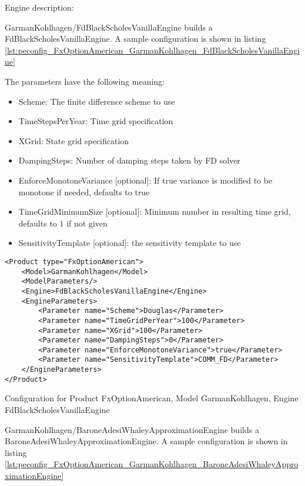Engine description:

GarmanKohlhagen/FdBlackScholesVanillaEngine builds a FdBlackScholesVanillaEngine. A sample configuration is shown in listing
\ref{lst:peconfig_FxOptionAmerican_GarmanKohlhagen_FdBlackScholesVanillaEngine}

The parameters have the following meaning:

\begin{itemize}
\item Scheme: The finite difference scheme to use
\item TimeStepsPerYear: Time grid specification
\item XGrid: State grid specification
\item DampingSteps: Number of damping steps taken by FD solver
\item EnforceMonotoneVariance [optional]: If true variance is modified to be monotone if needed, defaults to true
\item TimeGridMinimumSize [optional]: Minimum number in resulting time grid, defaults to $1$ if not given
\item SensitivityTemplate [optional]: the sensitivity template to use 
\end{itemize}

\begin{longlisting}
\begin{verbatim}
<Product type="FxOptionAmerican">
    <Model>GarmanKohlhagen</Model>
    <ModelParameters/>
    <Engine>FdBlackScholesVanillaEngine</Engine>
    <EngineParameters>
        <Parameter name="Scheme">Douglas</Parameter>
        <Parameter name="TimeGridPerYear">100</Parameter>
        <Parameter name="XGrid">100</Parameter>
        <Parameter name="DampingSteps">0</Parameter>
        <Parameter name="EnforceMonotoneVariance">true</Parameter>
        <Parameter name="SensitivityTemplate">COMM_FD</Parameter>
    </EngineParameters>
</Product>
\end{verbatim}
\caption{Configuration for Product FxOptionAmerican, Model GarmanKohlhagen, Engine FdBlackScholesVanillaEngine}
\label{lst:peconfig_FxOptionAmerican_GarmanKohlhagen_FdBlackScholesVanillaEngine}
\end{longlisting}

GarmanKohlhagen/BaroneAdesiWhaleyApproximationEngine builds a BaroneAdesiWhaleyApproximationEngine. A sample configuration is shown in listing
\ref{lst:peconfig_FxOptionAmerican_GarmanKohlhagen_BaroneAdesiWhaleyApproximationEngine}


